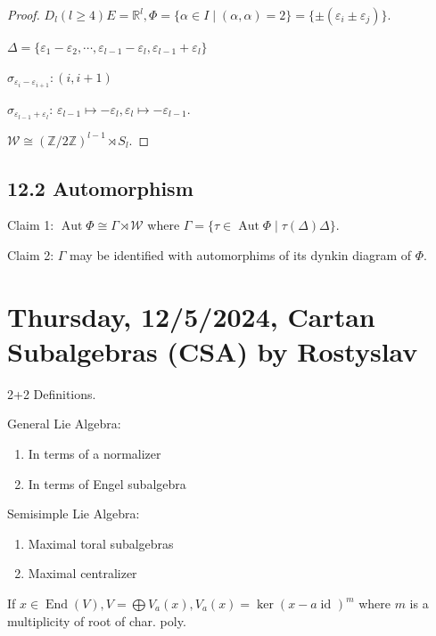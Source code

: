 \documentclass{article}
\theoremstyle{definition}
\begin{document}
\begin{proof}
    \(D_l (l \geq 4) E = \mathbb{R}^l, \Phi = \{ \alpha \in I \mid (\alpha , \alpha) = 2 \} = \{\pm (\varepsilon_i \pm \varepsilon_j)\}\).

    \(\Delta = \{ \varepsilon_1 - \varepsilon_2 , \cdots , \varepsilon_{l-1} - \varepsilon_l, \varepsilon_{l-1} + \varepsilon_l \} \)
    
    \(\sigma_{\varepsilon_{i} - \varepsilon_{i+1} }: (i, i+1)\)
    
    \(\sigma_{\varepsilon_{l-1} + \varepsilon_l} \): \(\varepsilon_{l-1} \mapsto - \varepsilon_l, \varepsilon_l \mapsto - \varepsilon_{l-1}\).

    \(\mathcal{W} \cong (\mathbb{Z} / 2\mathbb{Z})^{l-1} \rtimes S_l\).
    

\end{proof}

\subsection{12.2 Automorphism}

Claim 1: \(\operatorname{Aut} \Phi \cong \Gamma \rtimes \mathcal{W}\) where \(\Gamma = \{ \tau \in \operatorname{Aut} \Phi \mid \tau(\Delta)  \Delta \} \).

Claim 2: \(\Gamma\) may be identified with automorphims of its dynkin diagram of \(\Phi\).

\section{Thursday, 12/5/2024, Cartan Subalgebras (CSA) by Rostyslav}

2+2 Definitions.

General Lie Algebra:

\begin{enumerate}[label=\roman*)]
    \item In terms of a normalizer
    \item In terms of Engel subalgebra 
\end{enumerate} 

Semisimple Lie Algebra:

\begin{enumerate}[label=\roman*)]
    \item Maximal toral subalgebras
    \item Maximal centralizer 
\end{enumerate} 

If \(x\in \operatorname{End} (V), V = \bigoplus V_a(x), V_a(x) = \ker (x-a \operatorname{id}_{})^m\) where \(m\) is a multiplicity of root of char. poly.
\end{document}
